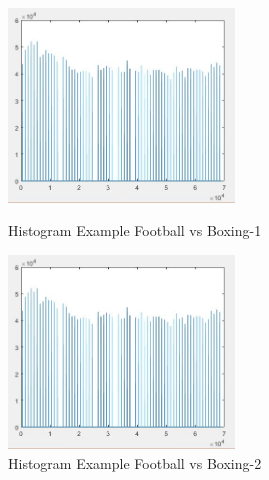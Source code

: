 \documentclass[runningheads,a4paper]{llncs}
\begin{document}
		\begin{figure}[htbp]
		\centering
		\begin{minipage}[t]{0.49\textwidth}
		\centering
		\includegraphics[width=6cm]{footballBoxing-1.JPG}
		\caption{Histogram Example Football vs Boxing-1}
		\label{fig:he-1}
		\end{minipage}
		\begin{minipage}[t]{0.49\textwidth}
		\centering
		\includegraphics[width=6cm]{footballBoxing-1.JPG}
		\caption{Histogram Example Football vs Boxing-2}
		\label{fig:he-2}
		\end{minipage}
		\end{figure}
\end{document}
